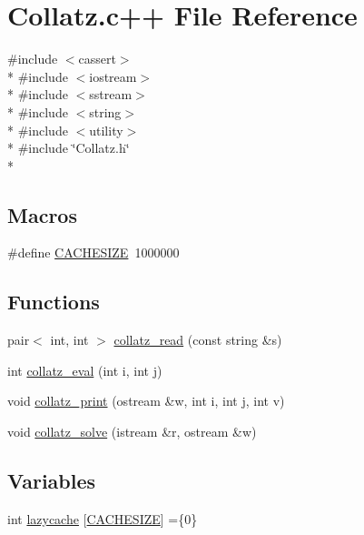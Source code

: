 \hypertarget{Collatz_8c_09_09}{\section{Collatz.\-c++ File Reference}
\label{Collatz_8c_09_09}
}
{\ttfamily \#include $<$cassert$>$}\\*
{\ttfamily \#include $<$iostream$>$}\\*
{\ttfamily \#include $<$sstream$>$}\\*
{\ttfamily \#include $<$string$>$}\\*
{\ttfamily \#include $<$utility$>$}\\*
{\ttfamily \#include \char`\"{}Collatz.\-h\char`\"{}}\\*
\subsection*{Macros}
\begin{DoxyCompactItemize}
\item 
\#define \hyperlink{Collatz_8c_09_09_ac6cac52a3e9d61f741714f164dc59c41}{C\-A\-C\-H\-E\-S\-I\-Z\-E}~1000000
\end{DoxyCompactItemize}
\subsection*{Functions}
\begin{DoxyCompactItemize}
\item 
pair$<$ int, int $>$ \hyperlink{Collatz_8c_09_09_a2772f8a734aeab48332eb3b282f991ba}{collatz\-\_\-read} (const string \&s)
\item 
int \hyperlink{Collatz_8c_09_09_a0b0d3827a619c18aa4d96b8ee8b1c47d}{collatz\-\_\-eval} (int i, int j)
\item 
void \hyperlink{Collatz_8c_09_09_aeda0b7ea3e40e1e7487ccc436f33a559}{collatz\-\_\-print} (ostream \&w, int i, int j, int v)
\item 
void \hyperlink{Collatz_8c_09_09_a0ac646d2122741f9a9a52201bf9551cc}{collatz\-\_\-solve} (istream \&r, ostream \&w)
\end{DoxyCompactItemize}
\subsection*{Variables}
\begin{DoxyCompactItemize}
\item 
int \hyperlink{Collatz_8c_09_09_ab4e9dc0770a2bfa353b075d41c82f2a6}{lazycache} \mbox{[}\hyperlink{SphereCollatz_8c_09_09_ac6cac52a3e9d61f741714f164dc59c41}{C\-A\-C\-H\-E\-S\-I\-Z\-E}\mbox{]} =\{0\}
\end{DoxyCompactItemize}


